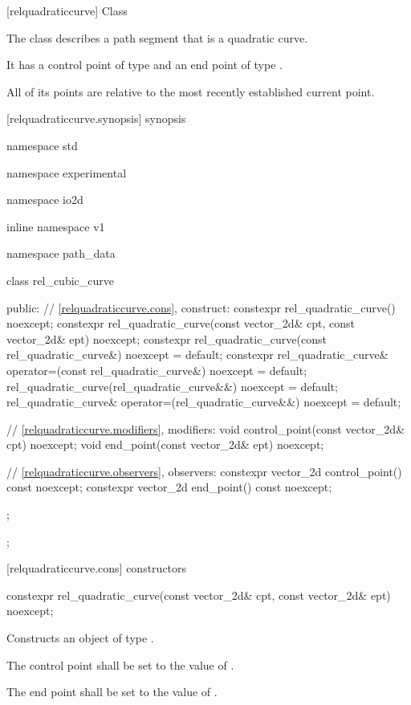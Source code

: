  [relquadraticcurve] {Class }

\pnum
{}
The class  describes a path segment that is a quadratic \bezierlocal curve.

\pnum
It has a control point of type  and an end point of type .

\pnum
All of its points are relative to the most recently established current point.

 [relquadraticcurve.synopsis] { synopsis}

\begin{codeblock}
namespace std { namespace experimental { namespace io2d { inline namespace v1 {
  namespace path_data {
    class rel_cubic_curve {
    public:
      // \ref{relquadraticcurve.cons}, construct:
      constexpr rel_quadratic_curve() noexcept;
      constexpr rel_quadratic_curve(const vector_2d& cpt, const vector_2d& ept)
        noexcept;
      constexpr rel_quadratic_curve(const rel_quadratic_curve&)
        noexcept = default;
      constexpr rel_quadratic_curve& operator=(const rel_quadratic_curve&)
        noexcept = default;
      rel_quadratic_curve(rel_quadratic_curve&&) noexcept = default;
      rel_quadratic_curve& operator=(rel_quadratic_curve&&) noexcept = default;

      // \ref{relquadraticcurve.modifiers}, modifiers:
      void control_point(const vector_2d& cpt) noexcept;
      void end_point(const vector_2d& ept) noexcept;

      // \ref{relquadraticcurve.observers}, observers:
      constexpr vector_2d control_point() const noexcept;
      constexpr vector_2d end_point() const noexcept;
    };
  };
} } } }
\end{codeblock}

 [relquadraticcurve.cons] { constructors}

\begin{itemdecl}
constexpr rel_quadratic_curve(const vector_2d& cpt, const vector_2d& ept)
  noexcept;
\end{itemdecl}
\begin{itemdescr}
	\pnum
	\effects
	Constructs an object of type .
	
	\pnum
	The control point shall be set to the value of .
	
	\pnum
	The end point shall be set to the value of .
\end{itemdescr}

